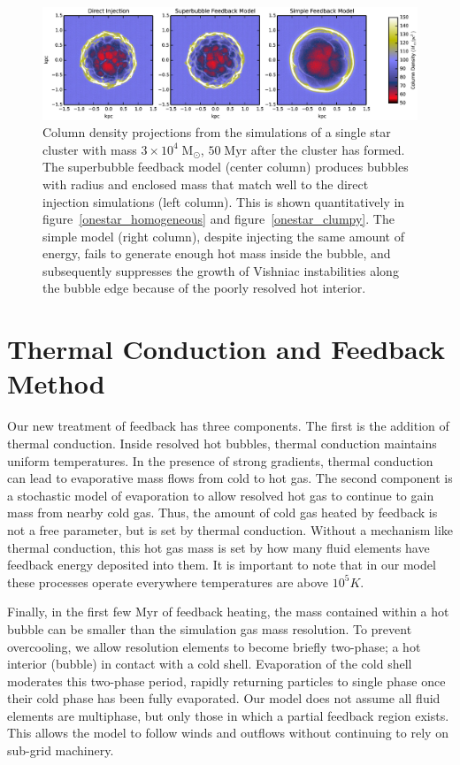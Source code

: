 \begin{figure}
    \includegraphics[width=\textwidth]{figures1/onestar_column.eps}
    \caption[Column density plot of a superbubble from a single cluster]{Column
    density projections from the simulations of a single star cluster with mass
    $3\times10^4\;\mathrm{M_\odot}$, $50\;\mathrm{Myr}$ after the cluster has
    formed.  The superbubble feedback model (center column) produces bubbles
    with radius and enclosed mass that match well to the direct injection
    simulations (left column).  This is shown quantitatively in
    figure~\ref{onestar_homogeneous} and figure~\ref{onestar_clumpy}.  The
    simple model (right column), despite injecting the same amount of energy,
    fails to generate enough hot mass inside the bubble, and subsequently
    suppresses the growth of Vishniac instabilities along the bubble edge
    because of the poorly resolved hot interior.}
    \label{onestar_column}
\end{figure}


\section{Thermal Conduction and Feedback Method}\label{method}
Our new treatment of feedback has three components.  The first is the addition
of thermal conduction.   Inside resolved hot bubbles, thermal conduction
maintains uniform temperatures.   In the presence of strong gradients, thermal
conduction can lead to evaporative mass flows from cold to hot gas.  The second
component is a stochastic model of evaporation to allow resolved hot gas to
continue to gain mass from nearby cold gas.  Thus, the amount of cold gas heated
by feedback is not a free parameter, but is set by thermal conduction.  
Without a mechanism like thermal conduction, this hot gas mass is set by
how many fluid elements have feedback energy deposited into them.   It is
important to note that in our model these processes operate everywhere
temperatures are above $10^5K$. 

Finally, in the first few $\mathrm{Myr}$ of feedback heating, the mass contained
within a hot bubble can be smaller than the simulation gas mass resolution.  To
prevent overcooling, we allow resolution elements to become briefly two-phase; a
hot interior (bubble) in contact with a cold shell.  Evaporation of the cold
shell moderates this two-phase period, rapidly returning particles to single
phase once their cold phase has been fully evaporated.  Our model does not
assume all fluid elements are multiphase, but only those in which a partial
feedback region exists.  This allows the model to follow winds and outflows
without continuing to rely on sub-grid machinery.  

